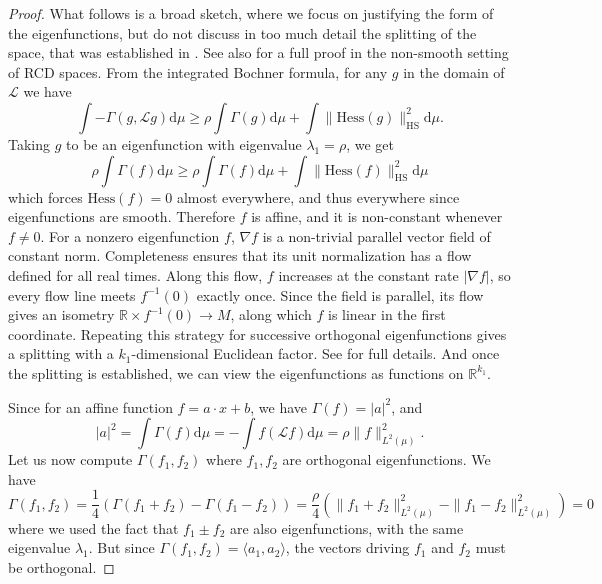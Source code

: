 \documentclass[10pt,reqno]{amsart}
\numberwithin{equation}{section}
\begin{document}
\begin{proof}
  What follows is a broad sketch, where we focus on justifying the form of the
  eigenfunctions, but do not discuss in too much detail the splitting of the
  space, that was established in \cite{CZ17}. See also \cite{GKKO20} for a
  full proof in the non-smooth setting of RCD spaces. From the integrated
  Bochner formula, for any $g$ in the domain of $\mathcal{L}$ we have
  \begin{equation}
    \int-\Gamma(g,\mathcal{L} g)\mathrm{d}\mu 
    \geq \rho \int\Gamma(g)\mathrm{d}\mu + \int\|\mathrm{Hess}(g)\|_{\mathrm{HS}}^2\mathrm{d}\mu.
  \end{equation}
  Taking $g$ to be an eigenfunction with eigenvalue $\lambda_1 = \rho$, we get
  \begin{equation}
    \rho \int\Gamma(f)\mathrm{d}\mu
    \geq \rho \int\Gamma(f)\mathrm{d}\mu + \int\|\mathrm{Hess}(f)\|_{\mathrm{HS}}^2\mathrm{d}\mu
  \end{equation}
  which forces $\mathrm{Hess}(f) = 0$ almost everywhere, and thus everywhere
  since eigenfunctions are smooth. Therefore $f$ is affine, and it is
  non-constant whenever $f\ne0$.
  For a nonzero eigenfunction $f$, $\nabla f$ is a non-trivial parallel
  vector field of constant norm. Completeness ensures that its unit
  normalization has a flow defined for all real times. Along this flow,
  $f$ increases at the constant rate $|\nabla f|$, so every flow line meets
  $f^{-1}(0)$ exactly once. Since the field is parallel, its flow gives an
  isometry $\mathbb{R}\times f^{-1}(0)\to M$, along which $f$ is linear
  in the first coordinate. Repeating this
  strategy for successive orthogonal eigenfunctions gives a splitting with a
  $k_1$-dimensional Euclidean factor. See \cite{CZ17} for full details. And once
  the splitting is established, we can view the eigenfunctions as functions on
  $\mathbb{R}^{k_1}$.

  Since for an affine function $f = a\cdot x + b$, we have $\Gamma(f) = |a|^2$, and
  \begin{equation}
    |a|^2 =\int\Gamma(f)\mathrm{d}\mu = -\int f(\mathcal{L} f)\mathrm{d}\mu = \rho\|f\|_{L^2(\mu)}^2.
  \end{equation}
  Let us now compute $\Gamma(f_1, f_2)$ where $f_1, f_2$ are orthogonal
  eigenfunctions. We have
  \begin{equation}
    \Gamma(f_1, f_2) = \frac{1}{4}(\Gamma(f_1 + f_2) - \Gamma(f_1-f_2)) 
                     = \frac{\rho}{4}(\|f_1 + f_2\|_{L^2(\mu)}^2 - \|f_1 - f_2\|_{L^2(\mu)}^2) 
                     = 0
  \end{equation}
  where we used the fact that $f_1 \pm f_2$ are also eigenfunctions, with the
  same eigenvalue $\lambda_1$. But since
  $\Gamma(f_1, f_2) = \langle a_1, a_2\rangle$, the vectors driving $f_1$ and
  $f_2$ must be orthogonal.
\end{proof}


{\footnotesize}
\end{document}
